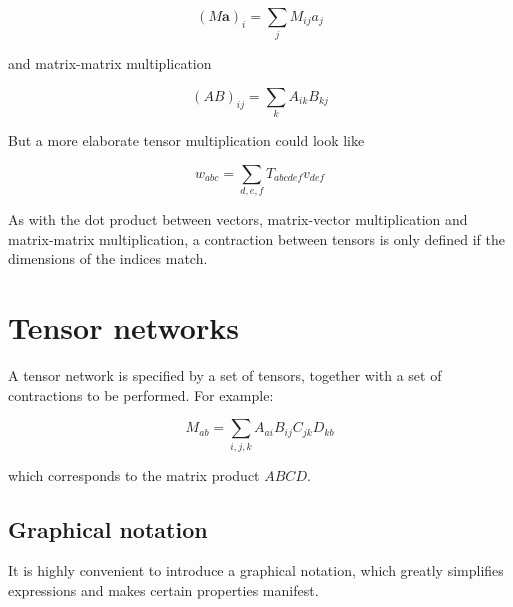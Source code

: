 \begin{equation}
  (M \bm{a})_{i} = \sum_j M_{i j} a_j
\end{equation}

and matrix-matrix multiplication

\begin{equation}
  (A B)_{i j} = \sum_k A_{i k} B_{k j}
\end{equation}

But a more elaborate tensor multiplication could look like

\begin{equation}
  w_{a b c} = \sum_{d, e, f} T_{a b c d e f} v_{d e f}
\end{equation}

As with the dot product between vectors, matrix-vector multiplication and
matrix-matrix multiplication, a contraction between tensors is only defined if
the dimensions of the indices match.

\section{Tensor networks}

A tensor network is specified by a set of tensors, together with a set of contractions to be performed. For example:

\begin{equation}
  M_{a b} = \sum_{i, j, k} A_{a i} B_{i j} C_{j k} D_{k b}
\end{equation}

which corresponds to the matrix product $A B C D$.

\subsection{Graphical notation}
It is highly convenient to introduce a graphical notation, which
greatly simplifies expressions and makes certain properties manifest.


